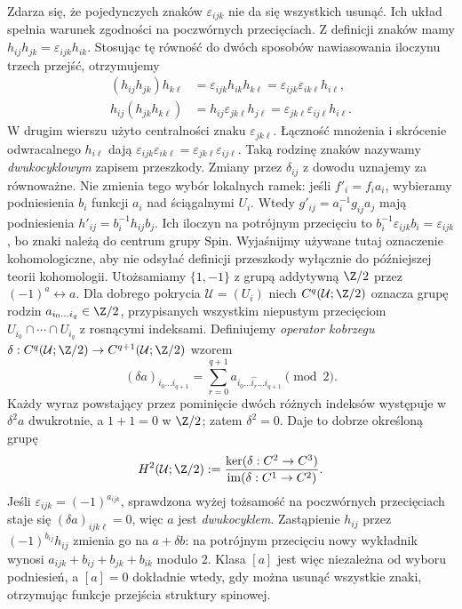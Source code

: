 \begin{uwaga}
Zdarza się, że pojedynczych znaków
$\varepsilon_{ijk}$ nie da się wszystkich
usunąć. Ich układ spełnia warunek zgodności
na poczwórnych przecięciach. Z definicji znaków mamy
$h_{ij}h_{jk}=\varepsilon_{ijk}h_{ik}$.
Stosując tę równość do dwóch sposobów nawiasowania
iloczynu trzech przejść, otrzymujemy
\[
 \begin{aligned}
 (h_{ij}h_{jk})h_{k\ell}
 &=\varepsilon_{ijk}h_{ik}h_{k\ell}
 =\varepsilon_{ijk}\varepsilon_{ik\ell}h_{i\ell},\\
 h_{ij}(h_{jk}h_{k\ell})
 &=h_{ij}\varepsilon_{jk\ell}h_{j\ell}
 =\varepsilon_{jk\ell}\varepsilon_{ij\ell}h_{i\ell}.
 \end{aligned}
\]
W drugim wierszu użyto centralności znaku $\varepsilon_{jk\ell}$.
Łączność mnożenia i skrócenie odwracalnego $h_{i\ell}$
dają $\varepsilon_{ijk}\varepsilon_{ik\ell}
=\varepsilon_{jk\ell}\varepsilon_{ij\ell}$.
Taką rodzinę znaków nazywamy
\emph{dwukocyklowym} zapisem przeszkody.
Zmiany przez $\delta_{ij}$ z dowodu
uznajemy za równoważne. Nie zmienia tego wybór lokalnych ramek:
jeśli $f'_i=f_i a_i$, wybieramy podniesienia $b_i$ funkcji $a_i$
nad ściągalnymi $U_i$. Wtedy $g'_{ij}=a_i^{-1}g_{ij}a_j$
mają podniesienia $h'_{ij}=b_i^{-1}h_{ij}b_j$.
Ich iloczyn na potrójnym przecięciu to
$b_i^{-1}\varepsilon_{ijk}b_i=\varepsilon_{ijk}$,
bo znaki należą do centrum grupy Spin.
Wyjaśnijmy używane tutaj oznaczenie kohomologiczne,
aby nie odsyłać definicji przeszkody wyłącznie do
późniejszej teorii kohomologii. Utożsamiamy
$\{1,-1\}$ z grupą addytywną $\Z/2$ przez
$(-1)^a\longleftrightarrow a$.
Dla dobrego pokrycia $\mathcal U=(U_i)$
niech $C^q(\mathcal U;\Z/2)$ oznacza grupę rodzin
$a_{i_0\ldots i_q}\in\Z/2$, przypisanych
wszystkim niepustym przecięciom
$U_{i_0}\cap\cdots\cap U_{i_q}$ z rosnącymi indeksami.
Definiujemy \emph{operator kobrzegu}
$\delta:C^q(\mathcal U;\Z/2)\to C^{q+1}(\mathcal U;\Z/2)$ wzorem
\[
 (\delta a)_{i_0\ldots i_{q+1}}
 =\sum_{r=0}^{q+1}
 a_{i_0\ldots\widehat{i_r}\ldots i_{q+1}}
 \pmod 2.
\]
Każdy wyraz powstający przez pominięcie dwóch
różnych indeksów występuje w $\delta^2 a$ dwukrotnie,
a $1+1=0$ w $\Z/2$; zatem $\delta^2=0$.
Daje to dobrze określoną grupę
\[
 H^2(\mathcal U;\Z/2)
 :=\frac{\ker(\delta:C^2\to C^3)}
          {\operatorname{im}(\delta:C^1\to C^2)}.
\]
Jeśli $\varepsilon_{ijk}=(-1)^{a_{ijk}}$,
sprawdzona wyżej tożsamość na poczwórnych
przecięciach staje się
$(\delta a)_{ijk\ell}=0$, więc $a$ jest
\emph{dwukocyklem}. Zastąpienie
$h_{ij}$ przez $(-1)^{b_{ij}}h_{ij}$
zmienia go na $a+\delta b$:
na potrójnym przecięciu nowy wykładnik
wynosi $a_{ijk}+b_{ij}+b_{jk}+b_{ik}$
modulo $2$. Klasa $[a]$ jest więc niezależna
od wyboru podniesień, a $[a]=0$ dokładnie wtedy,
gdy można usunąć wszystkie znaki, otrzymując
funkcje przejścia struktury spinowej.


\end{uwaga}
